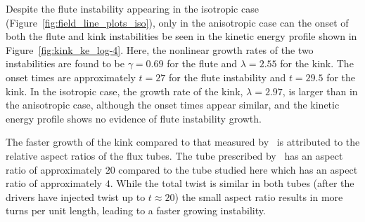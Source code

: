 \documentclass[fleqn,usenatbib]{mnras}
\newcommand{\revcite}[1]{{\color{red} \underline{#1}}}
\newcommand{\mycaption}[2]{\caption[#1]{\emph{#1} #2}}
\begin{document}

Despite the flute instability appearing in the isotropic case
(Figure~\ref{fig:field_line_plots_iso}), only in the anisotropic case can the
onset of both the flute and kink instabilities be seen in the kinetic energy
profile shown in Figure~\ref{fig:kink_ke_log-4}. Here, the nonlinear growth
rates of the two instabilities are found to be $\gamma = 0.69$ for the flute
and $\lambda = 2.55$ for the kink. The onset times are approximately $t=27$ for
the flute instability and $t=29.5$ for the kink. In the isotropic case, the
growth rate of the kink, $\lambda = 2.97$, is larger than in the anisotropic
case, although the onset times appear similar, and the kinetic energy profile
shows no evidence of flute instability growth. 

The faster growth of the kink compared to that measured by~\revcite{\citet{quinnEffectAnisotropicViscosity2020}} is attributed to the relative
aspect ratios of the flux tubes. The tube prescribed by~\revcite{\citet{quinnEffectAnisotropicViscosity2020}} has an aspect ratio of
approximately $20$ compared to the tube studied here which has an aspect ratio
of approximately $4$. While the total twist is similar in both tubes (after the
drivers have injected twist up to $t\approx20$) the small aspect ratio results
in more turns per unit length, leading to a faster growing instability. 
\end{document}
